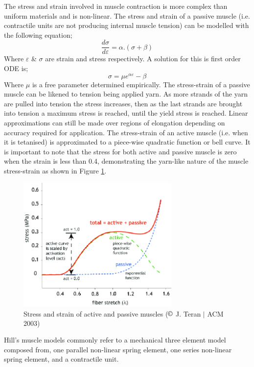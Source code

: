 The stress and strain involved in muscle contraction is more complex than uniform materials and is non-linear. The stress and strain of a passive muscle (i.e. contractile units are not producing internal muscle tension) can be modelled with the following equation; 
\begin{equation}
    \frac{d\sigma}{d\varepsilon} =  \alpha.(\sigma+\beta)
\end{equation}
Where $\varepsilon$ \& $\sigma$ are strain and stress respectively. A solution for this is first order ODE is; 
\begin{equation}
    \sigma = \mu e^{\alpha\varepsilon} - \beta
\end{equation}
Where $\mu$ is a free parameter determined empirically. The stress-strain of a passive muscle can be likened to tension being applied yarn. As more strands of the yarn are pulled into tension the stress increases, then as the last strands are brought into tension a maximum stress is reached, until the yield stress is reached. Linear approximations can still be made over regions of elongation depending on accuracy required for application. The stress-strain of an active muscle (i.e. when it is tetanised) is approximated to a piece-wise quadratic function or bell curve. It is important to note that the stress for both active and passive muscle is zero when the strain is less than 0.4, demonstrating the yarn-like nature of the muscle stress-strain as shown in Figure \ref{fig:muscle-fibre-stress}.
\begin{figure}[H]
  \centering
  \includegraphics[width=8cm]{Figures/Muscle-fiber-active-and-passive-behavior.png}
  \caption{Stress and strain of active and passive muscles ($\copyright$ J. Teran $|$ ACM 2003)\citep{Teran2003}}
  \label{fig:muscle-fibre-stress}
\end{figure}
Hill's muscle models commonly refer to a mechanical three element model \citep{Hill1938} composed from, one parallel non-linear spring element, one series non-linear spring element, and a contractile unit.
